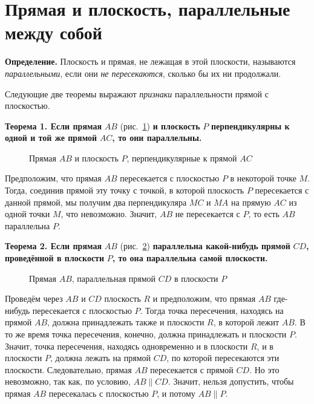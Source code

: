 \section*{Прямая и плоскость, параллельные между собой}

 \textbf{Определение.} Плоскость и прямая, не лежащая в этой плоскости, называются \emph{параллельными}, если они \emph{не пересекаются}, сколько бы их ни продолжали.

Следующие две теоремы выражают \emph{признаки} параллельности прямой с плоскостью.

 \textbf{Теорема 1. Если прямая} \(AB\) (рис.~\ref{fig:kiselev-stereo-320}) \textbf{и плоскость} \(P\) \textbf{перпендикулярны к одной и той же прямой} \(AC\)\textbf{, то они параллельны.}

\begin{figure}[htbp]
    \centering
    \renewcommand{\thefigure}{320}
    \captionsetup{name=Рис.,labelsep=period}
    
    \caption{Прямая \(AB\) и плоскость \(P\), перпендикулярные к прямой \(AC\)}\label{fig:kiselev-stereo-320}
\end{figure}

Предположим, что прямая \(AB\) пересекается с плоскостью \(P\) в некоторой точке \(M\). Тогда, соединив прямой эту точку с точкой, в которой плоскость \(P\) пересекается с данной прямой, мы получим два перпендикуляра \(MC\) и \(MA\) на прямую \(AC\) из одной точки \(M\), что невозможно. Значит, \(AB\) не пересекается с \(P\), то есть \(AB\) параллельна \(P\).

\textbf{Теорема 2. Если прямая} \(AB\) (рис.~\ref{fig:kiselev-stereo-321}) \textbf{параллельна какой-нибудь прямой} \(CD\)\textbf{, проведённой в плоскости} \(P\)\textbf{, то она параллельна самой плоскости.}

\begin{figure}[htbp]
    \centering
    \renewcommand{\thefigure}{321}
    \captionsetup{name=Рис.,labelsep=period}
    
    \caption{Прямая \(AB\), параллельная прямой \(CD\) в плоскости \(P\)}\label{fig:kiselev-stereo-321}
\end{figure}

Проведём через \(AB\) и \(CD\) плоскость \(R\) и предположим, что прямая \(AB\) где-нибудь пересекается с плоскостью \(P\). Тогда точка пересечения, находясь на прямой \(AB\), должна принадлежать также и плоскости \(R\), в которой лежит \(AB\). В то же время точка пересечения, конечно, должна принадлежать и плоскости \(P\). Значит, точка пересечения, находясь одновременно и в плоскости \(R\), и в плоскости \(P\), должна лежать на прямой \(CD\), по которой пересекаются эти плоскости. Следовательно, прямая \(AB\) пересекается с прямой \(CD\). Но это невозможно, так как, по условию, \(AB\parallel CD\). Значит, нельзя допустить, чтобы прямая \(AB\) пересекалась с плоскостью \(P\), и потому \(AB\parallel P\).

